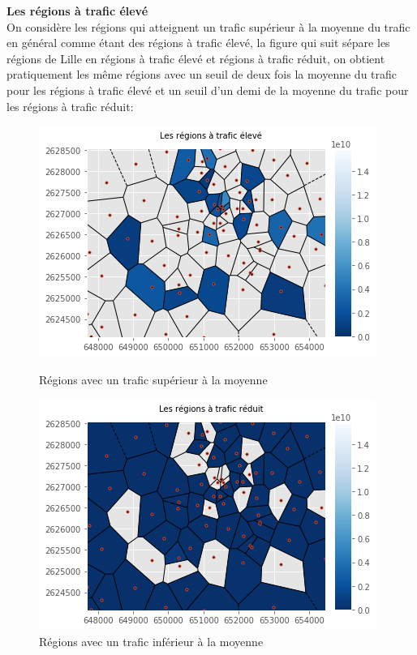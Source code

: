 \documentclass{report}
\begin{document}
\textbf{Les régions à trafic élevé }\\
On considère les régions qui atteignent un trafic supérieur à la moyenne du trafic en général comme étant des régions à trafic élevé, la figure qui suit sépare les régions de Lille en régions à trafic élevé et régions à trafic réduit, on obtient pratiquement les même régions avec un seuil de deux fois la moyenne du trafic pour les régions à trafic élevé et un seuil d'un demi de la moyenne du trafic pour les régions à trafic réduit:\\
\begin{figure}[H]
   \begin{minipage}{0.4\textwidth}
     \centering
     \includegraphics[scale=0.55]{images/te.png}
     \caption{Régions avec un trafic supérieur à la moyenne}\label{Fig:Data1}
   \end{minipage}\hfill
   \begin{minipage}{0.4\textwidth}
     \centering
     \includegraphics[scale=0.55]{images/tr.png}
     \caption{Régions avec un trafic inférieur à la moyenne}\label{Fig:Data2}
   \end{minipage}
\end{figure} 
\end{document}
